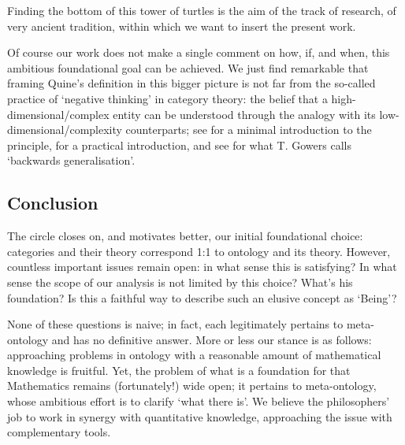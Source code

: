 Finding the bottom of this tower of turtles is the aim of the track of research, of very ancient tradition, within which we want to insert the present work.

Of course our work does not make a single comment on how, if, and when, this ambitious foundational goal can be achieved. We just find remarkable that framing Quine's definition in this bigger picture is not far from the so-called practice of `negative thinking' in category theory: the belief that a high-dimensional/complex entity can be understood through the analogy with its low-dimensional/complexity counterparts; see \cite{nlab:category-order,nlab:neg-think} for a minimal introduction to the principle, \cite{baez2010lectures} for a practical introduction, and see \cite{gowers2007} for what T. Gowers calls `backwards generalisation'.
\subsection{Conclusion}
The circle closes on, and motivates better, our initial foundational choice: categories and their theory correspond 1:1 to ontology and its theory. However, countless important issues remain open: in what sense this is satisfying? In what sense the scope of our analysis is not limited by this choice? What's his foundation? Is this a faithful way to describe such an elusive concept as `Being'?

None of these questions is naive; in fact, each legitimately pertains to meta-ontology and has no definitive answer. More or less our stance is as follows: approaching problems in ontology with a reasonable amount of mathematical knowledge is fruitful. Yet, the problem of what is a foundation for that Mathematics remains (fortunately!) wide open; it pertains to meta-ontology, whose ambitious effort is to clarify `what there is'. We believe the philosophers' job to work in synergy with quantitative knowledge, approaching the issue with complementary tools.